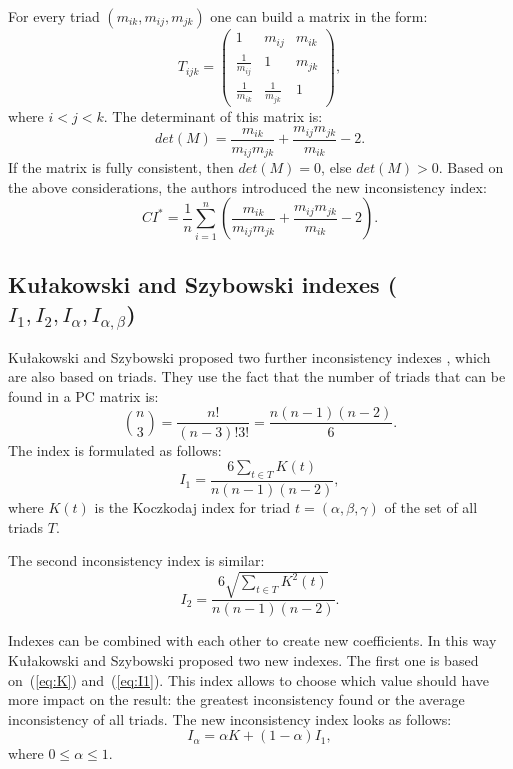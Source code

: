 For every triad $(m_{ik},m_{ij},m_{jk})$ one can build a matrix in the form: 
	\begin{equation} 
		T_{ijk}=\left(\begin{array}{ccc}
			1 & m_{ij} & m_{ik}\\
			\frac{1}{m_{ij}} & 1 & m_{jk}\\
			\frac{1}{m_{ik}} & \frac{1}{m_{jk}} & 1
		\end{array}\right),
	\end{equation}
	where $i<j<k$.
 The determinant of this matrix is:
	\begin{equation} 
		det(M)=\frac{m_{ik}}{m_{ij}m_{jk}}+\frac{m_{ij}m_{jk}}{m_{ik}}-2.
	 \end{equation}
 If the matrix is fully consistent, then $det(M)=0$, else $det(M)>0$. Based on the above considerations, the authors introduced the new inconsistency index:
 	\begin{equation} 
		\textit{CI}^{*}=\frac{1}{n}\sum_{i=1}^{n}\left(\frac{m_{ik}}{m_{ij}m_{jk}}+\frac{m_{ij}m_{jk}}{m_{ik}}-2\right).
	 \end{equation}
 

\subsection{Kułakowski and Szybowski indexes ($\textit{I}_1, \textit{I}_2, \textit{I}_{\alpha}, \textit{I}_{\alpha,\beta}$)}

Kułakowski and Szybowski proposed two further inconsistency indexes \cite{KULAKOWSKI20141}, which are also based on triads. They use the fact that the number of triads that can be found in a PC matrix is:
	\begin{equation} 
		\label{eq:nPo3}
		\binom{n}{3}=\frac{n!}{(n-3)!3!}=\frac{n(n-1)(n-2)}{6}.
	 \end{equation}
 The index is formulated as follows:
	 \begin{equation} 
	 \label{eq:I1}		
		I_{1}=\frac{6\sum_{t\in T}K(t)}{n(n-1)(n-2)},
	 \end{equation}
 where $K(t)$ is the Koczkodaj index for triad $t=(\alpha,\beta,\gamma)$ of the set of all triads $T$. 

The second inconsistency index is similar:
	\begin{equation} 
	 \label{eq:I2}				
		I_{2}=\frac{6\sqrt{\sum_{t\in T}K^{2}(t)}}{n(n-1)(n-2)}.
	 \end{equation}

Indexes can be combined with each other to create new coefficients. In this way Kułakowski and Szybowski proposed two new indexes. The first one is based on~(\ref{eq:K}) and~(\ref{eq:I1}). This index allows to choose which value should have more impact on the result: the greatest inconsistency found or the average inconsistency of all triads. The new inconsistency index looks as follows:
	\begin{equation} 
		I_{\alpha}=\alpha K+(1-\alpha)I_{1},
	 \end{equation}
 where $0\leq\alpha\leq1$.
  
